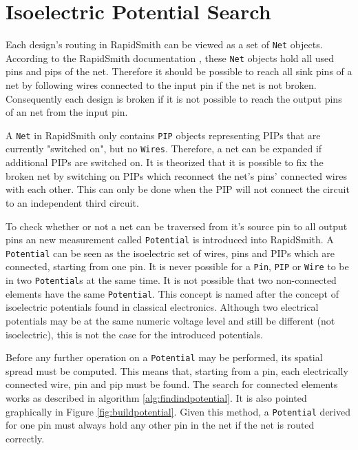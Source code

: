 \section{Isoelectric Potential Search}
\label{sec:isolectricelements}

Each design's routing in RapidSmith can be viewed as a set of \texttt{Net} objects. According to the RapidSmith documentation \cite{rapidsmith}, these \texttt{Net} objects hold all used pins and pips of the net.
Therefore it should be possible to reach all sink pins of a net by following wires connected to the input pin if the net is not broken.
Consequently each design is broken if it is not possible to reach the output pins of an net from the input pin.  

A \texttt{Net} in RapidSmith only contains \texttt{PIP} objects representing PIPs that are currently "switched on", but no \texttt{Wires}. Therefore, a net can be expanded if additional PIPs are switched on. 
It is theorized that it is possible to fix the broken net by switching on PIPs which reconnect the net's pins' connected wires with each other. This can only be done when the PIP will not connect the circuit to an independent third circuit.

To check whether or not a net can be traversed from it's source pin to all output pins an new measurement called \texttt{Potential} is introduced into RapidSmith.
A \texttt{Potential} can be seen as the isoelectric set of wires, pins and PIPs which are connected, starting from one pin.
It is never possible for a \texttt{Pin}, \texttt{PIP} or \texttt{Wire} to be in two \texttt{Potential}s at the same time. It is not possible that two non-connected elements have the same \texttt{Potential}. 
This concept is named after the concept of isoelectric potentials found in classical electronics. Although two electrical potentials may be at the same numeric voltage level and still be different (not isoelectric), this is not the case for the introduced potentials.

Before any further operation on a \texttt{Potential} may be performed, its spatial spread must be computed. This means that, starting from a pin, each electrically connected wire, pin and pip must be found. The search for connected elements works as described in algorithm \ref{alg:findindpotential}. It is also pointed graphically in Figure \ref{fig:buildpotential}. Given this method, a \texttt{Potential} derived for one pin must always hold any other pin in the net if the net is routed correctly.

